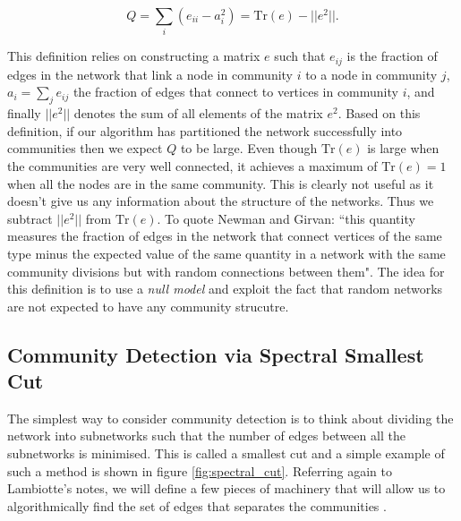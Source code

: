 $$ Q = \sum_i (e_{ii} - a_i^2) = \text{Tr}(e) - ||e^2||. $$

This definition relies on constructing a matrix $e$ such that $e_{ij}$ is the fraction of edges in the network that link a node in community $i$ to a node in community $j$, $a_i = \sum_j e_{ij}$ the fraction of edges that connect to vertices in community $i$, and finally $||e^2||$ denotes the sum of all elements of the matrix $e^2$. Based on this definition, if our algorithm has partitioned the network successfully into communities then we expect $Q$ to be large. Even though $\text{Tr}(e)$ is large when the communities are very well connected, it achieves a maximum of $\text{Tr}(e) = 1$ when all the nodes are in the same community. This is clearly not useful as it doesn't give us any information about the structure of the networks. Thus we subtract $||e^2||$ from $\text{Tr}(e)$. To quote Newman and Girvan: ``this quantity measures the fraction of edges in the network that connect vertices of the same type minus the expected value of the same quantity in a network with the same community divisions but with random connections between them". The idea for this definition is to use a \emph{null model} and exploit the fact that random networks are not expected to have any community strucutre.




\subsection{Community Detection via Spectral Smallest Cut}\label{sec:smallest_cut}
The simplest way to consider community detection is to think about dividing the network into subnetworks such that the number of edges between all the subnetworks is minimised. This is called a smallest cut and a simple example of such a method is shown in figure \ref{fig:spectral_cut}. Referring again to Lambiotte's notes, we will define a few pieces of machinery that will allow us to algorithmically find the set of edges that separates the communities \cite[p. 26-27]{oxford:renaud_notes}. 

